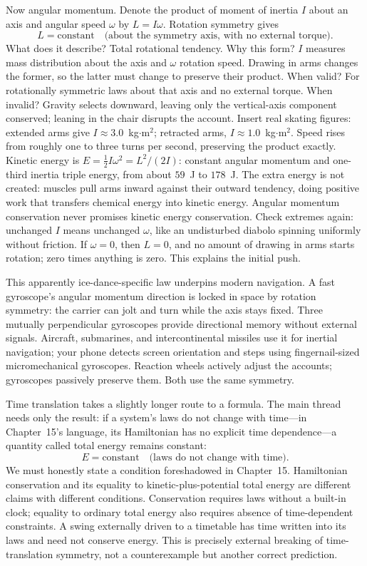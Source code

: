 Now angular momentum. Denote the product of moment of inertia \(I\) about an axis and angular speed \(\omega\) by \(L=I\omega\). Rotation symmetry gives
\[
L=\text{constant}\quad\text{(about the symmetry axis, with no external torque)}.
\]
What does it describe? Total rotational tendency. Why this form? \(I\) measures mass distribution about the axis and \(\omega\) rotation speed. Drawing in arms changes the former, so the latter must change to preserve their product. When valid? For rotationally symmetric laws about that axis and no external torque. When invalid? Gravity selects downward, leaving only the vertical-axis component conserved; leaning in the chair disrupts the account. Insert real skating figures: extended arms give \(I\approx3.0\)~kg\(\cdot\)m\(^2\); retracted arms, \(I\approx1.0\)~kg\(\cdot\)m\(^2\). Speed rises from roughly one to three turns per second, preserving the product exactly. Kinetic energy is \(E=\tfrac12 I\omega^2=L^2/(2I)\): constant angular momentum and one-third inertia triple energy, from about \(59\)~J to \(178\)~J. The extra energy is not created: muscles pull arms inward against their outward tendency, doing positive work that transfers chemical energy into kinetic energy. Angular momentum conservation never promises kinetic energy conservation. Check extremes again: unchanged \(I\) means unchanged \(\omega\), like an undisturbed diabolo spinning uniformly without friction. If \(\omega=0\), then \(L=0\), and no amount of drawing in arms starts rotation; zero times anything is zero. This explains the initial push.

This apparently ice-dance-specific law underpins modern navigation. A fast gyroscope's angular momentum direction is locked in space by rotation symmetry: the carrier can jolt and turn while the axis stays fixed. Three mutually perpendicular gyroscopes provide directional memory without external signals. Aircraft, submarines, and intercontinental missiles use it for inertial navigation; your phone detects screen orientation and steps using fingernail-sized micromechanical gyroscopes. Reaction wheels actively adjust the accounts; gyroscopes passively preserve them. Both use the same symmetry.

Time translation takes a slightly longer route to a formula. The main thread needs only the result: if a system's laws do not change with time---in Chapter~15's language, its Hamiltonian has no explicit time dependence---a quantity called total energy remains constant:
\[
E=\text{constant}\quad\text{(laws do not change with time)}.
\]
We must honestly state a condition foreshadowed in Chapter~15. Hamiltonian conservation and its equality to kinetic-plus-potential total energy are different claims with different conditions. Conservation requires laws without a built-in clock; equality to ordinary total energy also requires absence of time-dependent constraints. A swing externally driven to a timetable has time written into its laws and need not conserve energy. This is precisely external breaking of time-translation symmetry, not a counterexample but another correct prediction.

